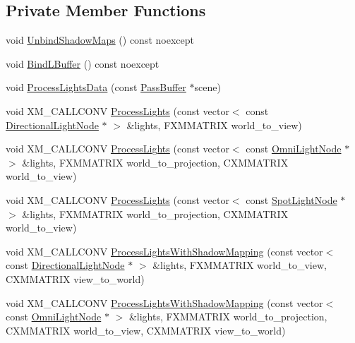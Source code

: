 \subsection*{Private Member Functions}
\begin{DoxyCompactItemize}
\item 
void \hyperlink{structmage_1_1_l_buffer_pass_af7abbf24eb7d20d9604beca5baa71f20}{Unbind\+Shadow\+Maps} () const noexcept
\item 
void \hyperlink{structmage_1_1_l_buffer_pass_a1ed227fef9a19d8274519c8ff6277e35}{Bind\+L\+Buffer} () const noexcept
\item 
void \hyperlink{structmage_1_1_l_buffer_pass_a4c83abfabfa8a144cab5d238045635f8}{Process\+Lights\+Data} (const \hyperlink{structmage_1_1_pass_buffer}{Pass\+Buffer} $\ast$scene)
\item 
void X\+M\+\_\+\+C\+A\+L\+L\+C\+O\+NV \hyperlink{structmage_1_1_l_buffer_pass_a03341222533877f82ac48b80628c609b}{Process\+Lights} (const vector$<$ const \hyperlink{namespacemage_a7637b5351fc0f66a10badd80ebb35899}{Directional\+Light\+Node} $\ast$ $>$ \&lights, F\+X\+M\+M\+A\+T\+R\+IX world\+\_\+to\+\_\+view)
\item 
void X\+M\+\_\+\+C\+A\+L\+L\+C\+O\+NV \hyperlink{structmage_1_1_l_buffer_pass_a6d7549bcd083afa625bd257975e041ad}{Process\+Lights} (const vector$<$ const \hyperlink{namespacemage_a1724c6e6b6b5ba535cdd967cbbb4a669}{Omni\+Light\+Node} $\ast$ $>$ \&lights, F\+X\+M\+M\+A\+T\+R\+IX world\+\_\+to\+\_\+projection, C\+X\+M\+M\+A\+T\+R\+IX world\+\_\+to\+\_\+view)
\item 
void X\+M\+\_\+\+C\+A\+L\+L\+C\+O\+NV \hyperlink{structmage_1_1_l_buffer_pass_ab3b4271e8a852f79fd6ff089463acf44}{Process\+Lights} (const vector$<$ const \hyperlink{namespacemage_aeed5dee4ff6c591eabb0e9114256df4a}{Spot\+Light\+Node} $\ast$ $>$ \&lights, F\+X\+M\+M\+A\+T\+R\+IX world\+\_\+to\+\_\+projection, C\+X\+M\+M\+A\+T\+R\+IX world\+\_\+to\+\_\+view)
\item 
void X\+M\+\_\+\+C\+A\+L\+L\+C\+O\+NV \hyperlink{structmage_1_1_l_buffer_pass_a4dc1726c775bb3f512e9ac32c7c0ef2c}{Process\+Lights\+With\+Shadow\+Mapping} (const vector$<$ const \hyperlink{namespacemage_a7637b5351fc0f66a10badd80ebb35899}{Directional\+Light\+Node} $\ast$ $>$ \&lights, F\+X\+M\+M\+A\+T\+R\+IX world\+\_\+to\+\_\+view, C\+X\+M\+M\+A\+T\+R\+IX view\+\_\+to\+\_\+world)
\item 
void X\+M\+\_\+\+C\+A\+L\+L\+C\+O\+NV \hyperlink{structmage_1_1_l_buffer_pass_a6623fb2306e894bef9e427b3794ab37d}{Process\+Lights\+With\+Shadow\+Mapping} (const vector$<$ const \hyperlink{namespacemage_a1724c6e6b6b5ba535cdd967cbbb4a669}{Omni\+Light\+Node} $\ast$ $>$ \&lights, F\+X\+M\+M\+A\+T\+R\+IX world\+\_\+to\+\_\+projection, C\+X\+M\+M\+A\+T\+R\+IX world\+\_\+to\+\_\+view, C\+X\+M\+M\+A\+T\+R\+IX view\+\_\+to\+\_\+world)

\end{DoxyCompactItemize}
